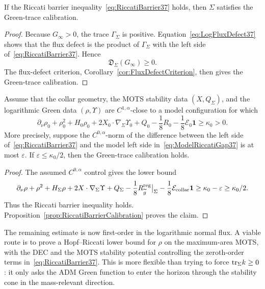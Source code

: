 \begin{proposition}\label{prop:RiccatiBarrierCalibration}
If the Riccati barrier inequality~\eqref{eq:RiccatiBarrier37} holds, then \(\Sigma\) satisfies the Green-trace calibration.
\end{proposition}

\begin{proof}
Because \(G_\infty>0\), the trace \(\Gamma_\Sigma\) is positive. Equation~\eqref{eq:LogFluxDefect37} shows that the flux defect is the product of \(\Gamma_\Sigma\) with the left side of~\eqref{eq:RiccatiBarrier37}. Hence
\[
    \mathfrak D_\Sigma(G_\infty)\ge0 .
\]
The flux-defect criterion, Corollary~\ref{cor:FluxDefectCriterion}, then gives the Green-trace calibration.
\end{proof}

\begin{theorem}\label{thm:PerturbativeRiccatiBarrier}
Assume that the collar geometry, the MOTS stability data \((X,Q_\Sigma)\), and the logarithmic Green data \((\rho,\Upsilon)\) are \(C^{1,\alpha}\)-close to a model configuration for which
\begin{equation}\label{eq:ModelRiccatiGap37}
    \partial_\nu\rho_0+\rho_0^2+H_0\rho_0
    +2X_0\cdot\nabla_\Sigma\Upsilon_0
    +Q_0-\frac18 R_0
    -\frac18\mathcal E_0\mathbf 1
    \ge \kappa_0>0 .
\end{equation}
More precisely, suppose the \(C^{0,\alpha}\)-norm of the difference between the left side of~\eqref{eq:RiccatiBarrier37} and the model left side in~\eqref{eq:ModelRiccatiGap37} is at most \(\varepsilon\). If \(\varepsilon\le\kappa_0/2\), then the Green-trace calibration holds.
\end{theorem}

\begin{proof}
The assumed \(C^{0,\alpha}\) control gives the lower bound
\[
    \partial_\nu\rho+\rho^2+H_\Sigma\rho
    +2X\cdot\nabla_\Sigma\Upsilon
    +Q_\Sigma-\frac18 R_{\widetilde{g}}^{\mathrm{reg}}\big|_\Sigma
    -\frac18\mathcal E_{\mathrm{collar}}\mathbf 1
    \ge \kappa_0-\varepsilon
    \ge \kappa_0/2 .
\]
Thus the Riccati barrier inequality holds. Proposition~\ref{prop:RiccatiBarrierCalibration} proves the claim.
\end{proof}

\begin{remark}\label{rem:NextBridge37}
The remaining estimate is now first-order in the logarithmic normal flux. A viable route is to prove a Hopf--Riccati lower bound for \(\rho\) on the maximum-area MOTS, with the DEC and the MOTS stability potential controlling the zeroth-order terms in~\eqref{eq:RiccatiBarrier37}. This is more flexible than trying to force \(\mathrm{tr}_\Sigma k\ge0\): it only asks the ADM Green function to enter the horizon through the stability cone in the mass-relevant direction.
\end{remark}

